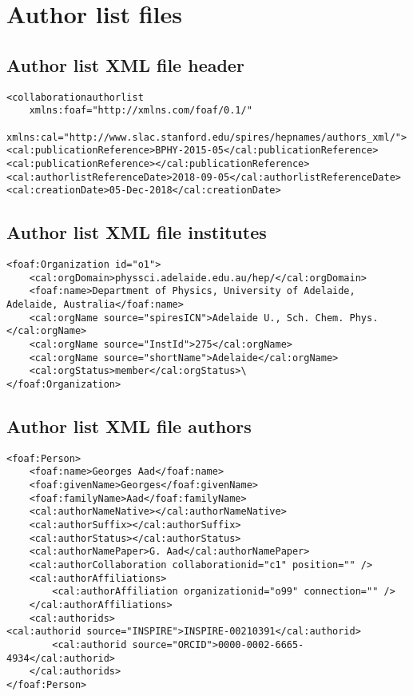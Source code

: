 \section{Author list files}%
\label{app:authorlist}

\subsection{Author list XML file header}%
\label{app:author:xmlheader}

\begin{lstlisting}
<collaborationauthorlist
    xmlns:foaf="http://xmlns.com/foaf/0.1/"
    xmlns:cal="http://www.slac.stanford.edu/spires/hepnames/authors_xml/">
<cal:publicationReference>BPHY-2015-05</cal:publicationReference>
<cal:publicationReference></cal:publicationReference>
<cal:authorlistReferenceDate>2018-09-05</cal:authorlistReferenceDate>
<cal:creationDate>05-Dec-2018</cal:creationDate>

\end{lstlisting}

\subsection{Author list XML file institutes}%
\label{app:author:xmlinstitute}

\begin{lstlisting}
<foaf:Organization id="o1">
    <cal:orgDomain>physsci.adelaide.edu.au/hep/</cal:orgDomain>
    <foaf:name>Department of Physics, University of Adelaide, Adelaide, Australia</foaf:name>
    <cal:orgName source="spiresICN">Adelaide U., Sch. Chem. Phys.</cal:orgName>
    <cal:orgName source="InstId">275</cal:orgName>
    <cal:orgName source="shortName">Adelaide</cal:orgName>
    <cal:orgStatus>member</cal:orgStatus>\
</foaf:Organization>

\end{lstlisting}

\subsection{Author list XML file authors}%
\label{app:author:xmlauthor}

\begin{lstlisting}
<foaf:Person>
    <foaf:name>Georges Aad</foaf:name>
    <foaf:givenName>Georges</foaf:givenName>
    <foaf:familyName>Aad</foaf:familyName>
    <cal:authorNameNative></cal:authorNameNative>
    <cal:authorSuffix></cal:authorSuffix>
    <cal:authorStatus></cal:authorStatus>
    <cal:authorNamePaper>G. Aad</cal:authorNamePaper>
    <cal:authorCollaboration collaborationid="c1" position="" />
    <cal:authorAffiliations>
        <cal:authorAffiliation organizationid="o99" connection="" />
    </cal:authorAffiliations>
    <cal:authorids>
<cal:authorid source="INSPIRE">INSPIRE-00210391</cal:authorid>
        <cal:authorid source="ORCID">0000-0002-6665-4934</cal:authorid>
    </cal:authorids>
</foaf:Person>

\end{lstlisting}